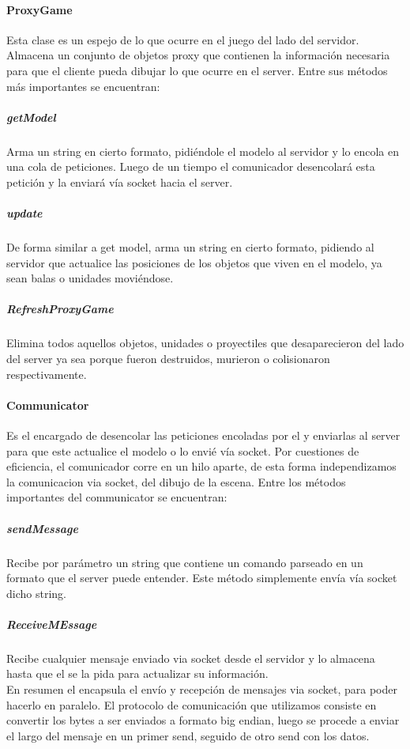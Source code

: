         \paragraph{ProxyGame}
            Esta clase es un espejo de lo que ocurre en el juego del lado del
            servidor. Almacena un conjunto de objetos proxy que contienen la
            información necesaria para que el cliente pueda dibujar lo que
            ocurre en el server. Entre sus métodos más importantes se encuentran:
            \subparagraph{getModel}
                Arma un string en cierto formato, pidiéndole el modelo al
                servidor y lo encola en una cola de peticiones. Luego de un
                tiempo el comunicador desencolará esta petición y la enviará
                vía socket hacia el server.
            \subparagraph{update}
                De forma similar a get model, arma un string en cierto formato,
                pidiendo al servidor que actualice las posiciones de los objetos
                que viven en el modelo, ya sean balas o unidades moviéndose.
            \subparagraph{RefreshProxyGame}
                Elimina todos aquellos objetos, unidades o proyectiles que
                desaparecieron del lado del server ya sea porque fueron
                destruidos, murieron o colisionaron respectivamente.
        \paragraph{Communicator}
            Es el encargado de desencolar las peticiones encoladas por el
             y enviarlas al server para que este actualice
            el modelo o lo envié vía socket. Por cuestiones de eficiencia, el
            comunicador corre en un hilo aparte, de esta forma independizamos la
            comunicacion via socket, del dibujo de la escena. Entre los métodos
            importantes del communicator se encuentran:
            \subparagraph{sendMessage}
                Recibe por parámetro un string que contiene un comando parseado
                en un formato que el server puede entender. Este método
                simplemente envía vía socket dicho string.
            \subparagraph{ReceiveMEssage}
                Recibe cualquier mensaje enviado via socket desde el servidor y
                lo almacena hasta que el  se la pida para
                actualizar su información.\\
                En resumen el  encapsula el envío y
                recepción de mensajes via socket, para poder hacerlo en paralelo.
                El protocolo de comunicación que utilizamos consiste en convertir
                los bytes a ser enviados a formato big endian, luego se procede a
                enviar el largo del mensaje en un primer send, seguido de otro send
                con los datos.
